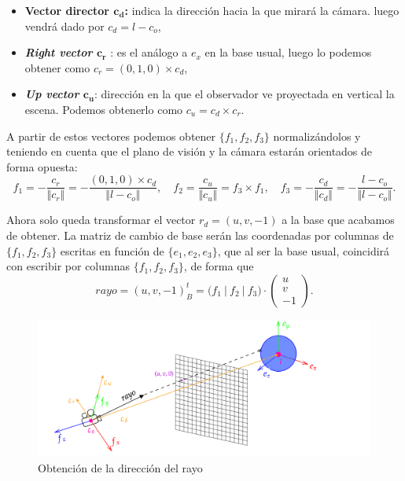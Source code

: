 \begin{itemize}
    \item \textbf{Vector director $\boldsymbol{c_d}$:} indica la dirección hacia la que mirará la cámara. luego vendrá dado por $c_d = l-c_o$,
    \item \textbf{\textit{Right vector} $\boldsymbol{c_r}$ }: es el análogo a $e_x$ en la base usual, luego lo podemos obtener como $c_r = (0,1,0)\times c_d$,
    \item \textbf{\textit{Up vector} $\boldsymbol{c_u}$}: dirección en la que el observador ve proyectada en vertical la escena. Podemos obtenerlo como $c_u = c_d\times c_r$.
\end{itemize}

A partir de estos vectores podemos obtener $\{f_1,f_2,f_3\}$ normalizándolos y teniendo en cuenta que el plano de visión y la cámara estarán orientados de forma opuesta:
\begin{equation*}
    f_1 = -\frac{c_r}{\Vert c_r\Vert} = -\frac{(0,1,0)\times c_d}{\Vert l-c_o\Vert},\quad 
    f_2 = \frac{c_u}{\Vert c_u\Vert } = f_3\times f_1, \quad
    f_3 = -\frac{c_d}{\Vert c_d\Vert} = -\frac{l-c_o}{\Vert l-c_o\Vert}. 
\end{equation*}

Ahora solo queda transformar el vector $r_d = (u,v,-1)$ a la base que acabamos de obtener. La matriz de cambio de base serán las coordenadas por columnas de $\{f_1,f_2,f_3\}$ escritas en función de $\{e_1,e_2,e_3\}$, que al ser la base usual, coincidirá con escribir por columnas $\{f_1,f_2,f_3\}$, de forma que
\begin{equation*}
    rayo = (u,v,-1)_{B}^t = \big(f_1\ \vert\  f_2\  \vert\  f_3\big) \cdot \begin{pmatrix}
        u\\
        v\\
        -1
    \end{pmatrix}.
\end{equation*}

\begin{figure}[ht!]
    \centering
    \includegraphics[width=\textwidth]{Plantilla-TFG-master/img/raydir_fix.png}
    \caption{Obtención de la dirección del rayo}
    \label{fig:raydir}
\end{figure}

